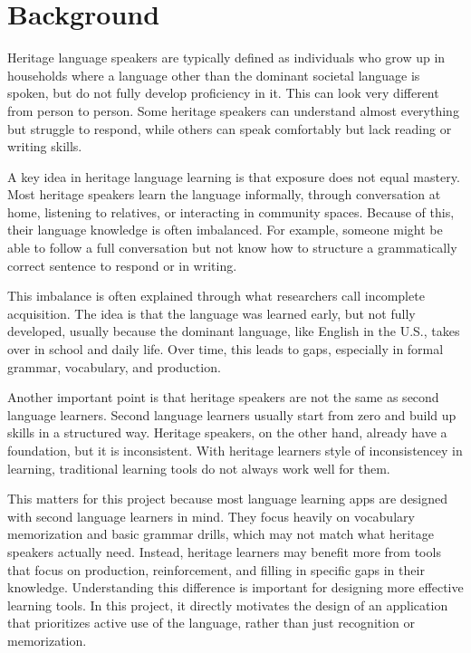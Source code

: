 \documentclass[12pt]{article}
\begin{document}
\section{Background}

  Heritage language speakers are typically defined as individuals who grow up in households where a language other than the dominant societal language is spoken, but do not fully develop proficiency in it. This can look very different from person to person. Some heritage speakers can understand almost everything but struggle to respond, while others can speak comfortably but lack reading or writing skills.

    A key idea in heritage language learning is that exposure does not equal mastery. Most heritage speakers learn the language informally, through conversation at home, listening to relatives, or interacting in community spaces. Because of this, their language knowledge is often imbalanced. For example, someone might be able to follow a full conversation but not know how to structure a grammatically correct sentence to respond or in writing.
   
   This imbalance is often explained through what researchers call incomplete acquisition. The idea is that the language was learned early, but not fully developed, usually because the dominant language, like English in the U.S., takes over in school and daily life. Over time, this leads to gaps, especially in formal grammar, vocabulary, and production.

	Another important point is that heritage speakers are not the same as second language learners. Second language learners usually start from zero and build up skills in a structured way. Heritage speakers, on the other hand, already have a foundation, but it is inconsistent. With heritage learners style of inconsistencey in learning, traditional learning tools do not always work well for them.

	This matters for this project because most language learning apps are designed with second language learners in mind. They focus heavily on vocabulary memorization and basic grammar drills, which may not match what heritage speakers actually need. Instead, heritage learners may benefit more from tools that focus on production, reinforcement, and filling in specific gaps in their knowledge. Understanding this difference is important for designing more effective learning tools. In this project, it directly motivates the design of an application that prioritizes active use of the language, rather than just recognition or memorization.
\end{document}

